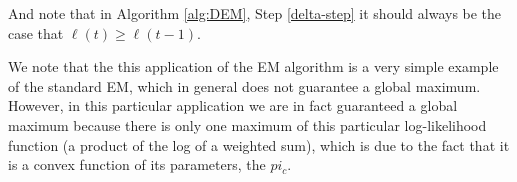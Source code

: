 \documentclass{article}\usepackage[]{graphicx}\usepackage[]{color}
\begin{document}
And note that in Algorithm \ref{alg:DEM}, Step \ref{delta-step} it should always be the case that $\ell(t) \geq \ell(t-1)$.

We note that the this application of the EM algorithm is a very simple example of the standard EM, which in general does not guarantee a global maximum. 
However, in this particular application we are in fact guaranteed a global maximum because there is only one maximum of this particular log-likelihood function (a product of the log of a weighted sum), which is due to the fact that it is a convex function of its parameters, the $pi_c$.




\end{document}
